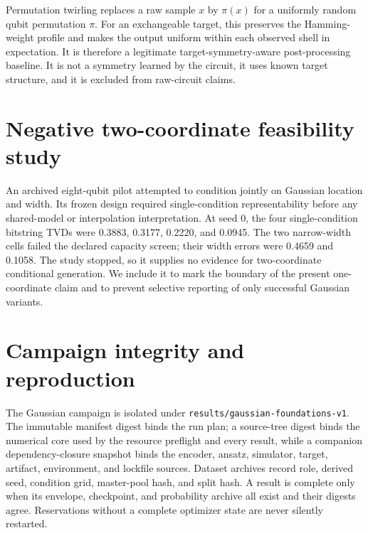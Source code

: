 Permutation twirling replaces a raw sample $x$ by $\pi(x)$ for a uniformly
random qubit permutation $\pi$.  For an exchangeable target, this preserves
the Hamming-weight profile and makes the output uniform within each observed
shell in expectation.  It is therefore a legitimate target-symmetry-aware
post-processing baseline.  It is not a symmetry learned by the circuit, it
uses known target structure, and it is excluded from raw-circuit claims.

\section{Negative two-coordinate feasibility study}
\label{app:negative-width}

An archived eight-qubit pilot attempted to condition jointly on Gaussian
location and width.  Its frozen design required single-condition
representability before any shared-model or interpolation interpretation.  At
seed 0, the four single-condition bitstring TVDs were 0.3883, 0.3177, 0.2220,
and 0.0945.  The two narrow-width cells failed the declared capacity screen;
their width errors were 0.4659 and 0.1058.  The study stopped, so it supplies
no evidence for two-coordinate conditional generation.  We include it to mark
the boundary of the present one-coordinate claim and to prevent selective
reporting of only successful Gaussian variants.

\section{Campaign integrity and reproduction}
\label{app:reproduction}

The Gaussian campaign is isolated under
\texttt{results/gaussian-foundations-v1}.  The immutable manifest digest binds
the run plan; a source-tree digest binds the numerical core used by the
resource preflight and every result, while a companion dependency-closure
snapshot binds the encoder, ansatz, simulator, target, artifact, environment,
and lockfile sources.  Dataset archives record role,
derived seed, condition grid, master-pool hash, and split hash.  A result is
complete only when its envelope, checkpoint, and probability archive all
exist and their digests agree.  Reservations without a complete optimizer
state are never silently restarted.


